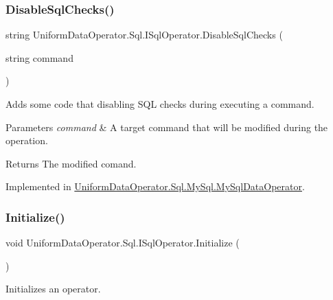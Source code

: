 \subsubsection{\texorpdfstring{Disable\+Sql\+Checks()}{DisableSqlChecks()}\hspace{0.1cm}{\footnotesize\ttfamily [2/2]}}
{\footnotesize\ttfamily string Uniform\+Data\+Operator.\+Sql.\+I\+Sql\+Operator.\+Disable\+Sql\+Checks (\begin{DoxyParamCaption}\item[{string}]{command }\end{DoxyParamCaption})}



Adds some code that disabling S\+QL checks during executing a command. 


\begin{DoxyParams}{Parameters}
{\em command} & A target command that will be modified during the operation. \\
\hline
\end{DoxyParams}
\begin{DoxyReturn}{Returns}
The modified comand. 
\end{DoxyReturn}


Implemented in \mbox{\hyperlink{class_uniform_data_operator_1_1_sql_1_1_my_sql_1_1_my_sql_data_operator_a3e80f9136c9fef46a443901a15f1e289}{Uniform\+Data\+Operator.\+Sql.\+My\+Sql.\+My\+Sql\+Data\+Operator}}.

\mbox{\label{interface_uniform_data_operator_1_1_sql_1_1_i_sql_operator_a590fa080f8c35ebf5ee6ac535545e2a8}} 
\subsubsection{\texorpdfstring{Initialize()}{Initialize()}}
{\footnotesize\ttfamily void Uniform\+Data\+Operator.\+Sql.\+I\+Sql\+Operator.\+Initialize (\begin{DoxyParamCaption}{ }\end{DoxyParamCaption})}



Initializes an operator. 



